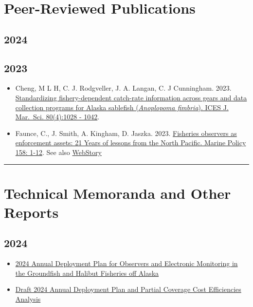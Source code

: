 \documentclass[
  letterpaper,
  DIV=11,
  numbers=noendperiod]{scrreprt}
\begin{document}
\section{Peer-Reviewed Publications}\label{peer-reviewed-publications}

\subsection{2024}\label{section}

\subsection{2023}\label{section-1}

\begin{itemize}
\item
  Cheng, M L H, C. J. Rodgveller, J. A. Langan, C. J Cunningham. 2023.
  \href{https://doi.org/10.1093/icesjms/fsad037}{Standardizing
  fishery-dependent catch-rate information across gears and data
  collection programs for Alaska sablefish (\emph{Anoplopoma fimbria}).
  ICES J. Mar.~Sci. 80(4):1028 - 1042}.
\item
  Faunce, C., J. Smith, A. Kingham, D. Jaszka. 2023.
  \href{https://doi.org/10.1016/j.marpol.2023.105868}{Fisheries
  observers as enforcement assets: 21 Years of lessons from the North
  Pacific. Marine Policy 158: 1-12}. See also
  \href{https://www.fisheries.noaa.gov/feature-story/advancing-transparency-fisheries-monitoring-and-enforcement}{WebStory}
\end{itemize}

\begin{center}\rule{0.5\linewidth}{0.5pt}\end{center}

\section{Technical Memoranda and Other
Reports}\label{technical-memoranda-and-other-reports}

\subsection{2024}\label{section-2}

\begin{itemize}
\item
  \href{https://www.fisheries.noaa.gov/s3//2023-11/Final-2024-ADP.pdf}{2024
  Annual Deployment Plan for Observers and Electronic Monitoring in the
  Groundfish and Halibut Fisheries off Alaska}
\item
  \href{https://www.fisheries.noaa.gov/s3//2023-11/Draft-2024-ADP.pdf}{Draft
  2024 Annual Deployment Plan and Partial Coverage Cost Efficiencies
  Analysis}
\end{itemize}
\end{document}
